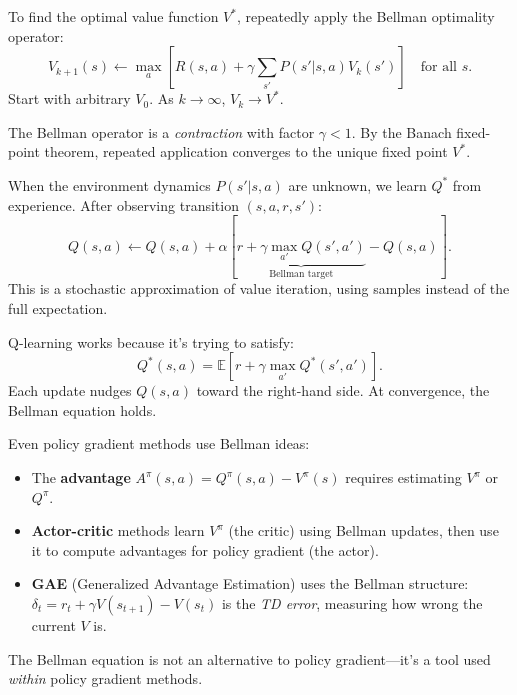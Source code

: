 \begin{definition}
    To find the optimal value function $V^*$, repeatedly apply the Bellman optimality operator:
    \[
        V_{k+1}(s) \leftarrow \max_{a} \left[ R(s,a) + \gamma \sum_{s'} P(s'|s,a) V_k(s') \right] \quad \text{for all } s.
    \]
    Start with arbitrary $V_0$. As $k \to \infty$, $V_k \to V^*$.
\end{definition}

\begin{remark}
    The Bellman operator is a \emph{contraction} with factor $\gamma < 1$. By the Banach fixed-point theorem, repeated application converges to the unique fixed point $V^*$.
\end{remark}

\begin{definition}
    When the environment dynamics $P(s'|s,a)$ are unknown, we learn $Q^*$ from experience. After observing transition $(s, a, r, s')$:
    \[
        Q(s,a) \leftarrow Q(s,a) + \alpha \left[ \underbrace{r + \gamma \max_{a'} Q(s', a')}_{\text{Bellman target}} - Q(s,a) \right].
    \]
    This is a stochastic approximation of value iteration, using samples instead of the full expectation.
\end{definition}

\begin{remark}
    Q-learning works because it's trying to satisfy:
    \[
        Q^*(s,a) = \mathbb{E}\left[ r + \gamma \max_{a'} Q^*(s',a') \right].
    \]
    Each update nudges $Q(s,a)$ toward the right-hand side. At convergence, the Bellman equation holds.
\end{remark}

\begin{remark}
    Even policy gradient methods use Bellman ideas:
    \begin{itemize}
        \item The \textbf{advantage} $A^\pi(s,a) = Q^\pi(s,a) - V^\pi(s)$ requires estimating $V^\pi$ or $Q^\pi$.
        \item \textbf{Actor-critic} methods learn $V^\pi$ (the critic) using Bellman updates, then use it to compute advantages for policy gradient (the actor).
        \item \textbf{GAE} (Generalized Advantage Estimation) uses the Bellman structure: $\delta_t = r_t + \gamma V(s_{t+1}) - V(s_t)$ is the \emph{TD error}, measuring how wrong the current $V$ is.
    \end{itemize}
    The Bellman equation is not an alternative to policy gradient---it's a tool used \emph{within} policy gradient methods.
\end{remark}

